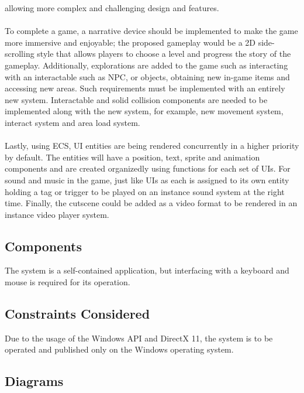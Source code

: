 allowing more complex and challenging design and features.
\\\\
To complete a game, a narrative device should be implemented to make the game more immersive and enjoyable;
the proposed gameplay would be a 2D side-scrolling style that allows players to choose a level and progress the story of the gameplay.
Additionally, explorations are added to the game such as interacting with an interactable such as NPC, or objects, obtaining new in-game items and accessing new areas.
Such requirements must be implemented with an entirely new system.
Interactable and solid collision components are needed to be implemented along with the new system, for example, new movement system, interact system and area load system.
\\\\
Lastly, using ECS, UI entities are being rendered concurrently in a higher priority by default.
The entities will have a position, text, sprite and animation components and are created organizedly using functions for each set of UIs.
For sound and music in the game, just like UIs as each is assigned to its own entity holding a tag or trigger to be played on an instance sound system at the right time.
Finally, the cutscene could be added as a video format to be rendered in an instance video player system.



\subsection{Components}
\label{subsec:components}

The system is a self-contained application, but interfacing with a keyboard and mouse is required for its operation.



\subsection{Constraints Considered}
\label{subsec:constraints-considered}

Due to the usage of the Windows API and DirectX 11, the system is to be operated and published only on
the Windows operating system.

\subsection{Diagrams}
\label{subsec:diagrams}

